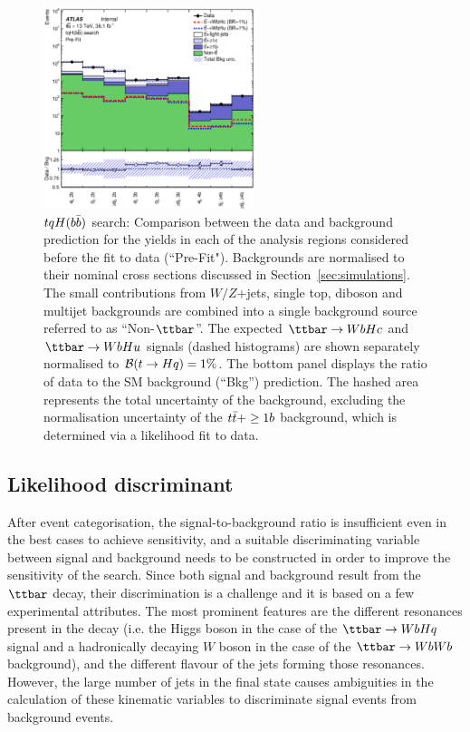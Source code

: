 \begin{figure}[t]
\begin{center}
\includegraphics[width=0.55\textwidth]{figures/Hbb/fit/cH_plots/Summary.eps}
\caption{$tqH(b\bar{b})$ search: Comparison between the data and background prediction for the yields in each of the analysis regions considered 
before the fit to data (``Pre-Fit"). Backgrounds are normalised to their nominal cross sections discussed in Section~\ref{sec:simulations}.
The small contributions from $W/Z$+jets,  single top, diboson and multijet backgrounds are combined into a single background source 
referred to as ``Non-$\ttbar$''. 
The expected $\Hc$ and $\Hu$ signals (dashed histograms) are shown separately normalised to $\mathcal{B}(t\to Hq)=1\%$.
The bottom panel displays the ratio of data to the SM background (``Bkg'') prediction. 
The hashed area represents the total uncertainty of the background, excluding the normalisation uncertainty of the $t\bar{t}+\geq1b$ background, 
which is determined via a likelihood fit to data.} 
\label{fig:Hbb_Summary}
\end{center}
\end{figure}

\subsection{Likelihood discriminant}
\label{sec:likelihood_discriminant}

After event categorisation, the signal-to-background ratio is insufficient even in the best cases to achieve sensitivity, and a suitable
discriminating variable between signal and background needs to be constructed in order to improve the sensitivity of the search.
Since both signal and background result from the $\ttbar$ decay, 
their discrimination is a challenge and it is based on a few experimental attributes.  
The most prominent features are the different resonances present in the decay (i.e. the Higgs boson in the case 
of the $\Hq$ signal and a hadronically decaying $W$ boson in the case of the $\ttbar \to WbWb$ background), and the different flavour of the 
jets forming those resonances. However, the large number of jets in the final state causes ambiguities in the calculation 
of these kinematic variables to discriminate signal events from background events. 

